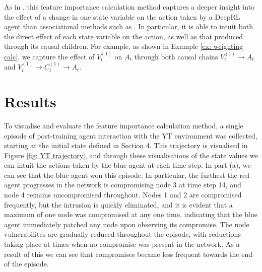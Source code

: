\documentclass{article}
\begin{document}
\noindent As in \cite{wang2022causal}, this feature importance calculation method captures a deeper insight into the effect of a change in one state variable on the action taken by a DeepRL agent than associational methods such as \cite{olson2021counterfactual}. In particular, it is able to intuit both the direct effect of each state variable on the action, as well as that produced through its causal children. For example, as shown in Example \ref{ex: weighting calc}, we capture the effect of $V^{(1)}_t$ on $A_t$ through both causal chains $V^{(1)}_t \rightarrow A_t$ and $V^{(1)}_t \rightarrow C^{(1)}_t \rightarrow A_t$.



\pagebreak

\section{Results}

To visualise and evaluate the feature importance calculation method, a single episode of post-training agent interaction with the YT environment was collected, starting at the initial state defined in Section 4. This trajectory is visualised in Figure \ref{fig: YT trajectory}, and through these visualisations of the state values we can intuit the actions taken by the blue agent at each time step. In part (a), we can see that the blue agent won this episode. In particular, the furthest the red agent progresses in the network is compromising node 3 at time step 14, and node 4 remains uncompromised throughout. Nodes 1 and 2 are compromised frequently, but the intrusion is quickly eliminated, and it is evident that a maximum of one node was compromised at any one time, indicating that the blue agent immediately patched  any node upon observing its compromise. The node vulnerabilites are gradually reduced throughout the episode, with reductions taking place at times when no compromise was present in the network. As a result of this we can see that compromises became less frequent towards the end of the episode. 
\end{document}
